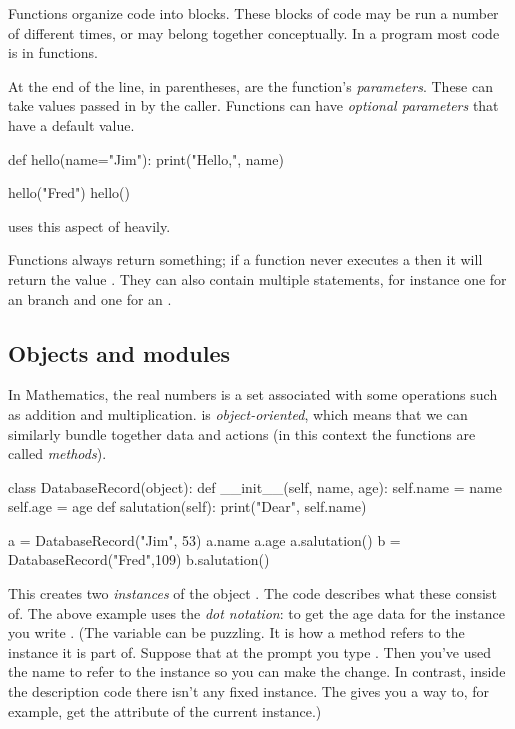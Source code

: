 Functions organize code into blocks. 
These blocks of code may be 
run a number of different times, or may belong together conceptually. 
In a \python{} program most code is in functions. 

At the end of the  line, in parentheses, are
the function's \textit{parameters}. 
These can take values 
passed in by the caller.
Functions can have \textit{optional parameters} that have a default value.
\begin{pythonconsole}
def hello(name="Jim"):
    print("Hello,", name)

hello("Fred")
hello()
\end{pythonconsole}
\noindent
\Sage{} uses this aspect of \python{} heavily.

Functions always return something; 
if a function never executes a  then it will
return the value .
They can also contain multiple  statements, for instance 
one for an  branch and one for an .




\subsection{Objects and modules}
In Mathematics, the real numbers is a set associated with some operations
such as addition and multiplication.
\python{} is \textit{object-oriented}, which means that we can similarly bundle
together data and actions (in this context the functions are called 
\textit{methods}).
\begin{pythonconsole}
class DatabaseRecord(object):
    def __init__(self, name, age):
        self.name = name
        self.age = age
    def salutation(self):
        print("Dear", self.name)

a = DatabaseRecord("Jim", 53)
a.name
a.age
a.salutation()
b = DatabaseRecord("Fred",109)
b.salutation()
\end{pythonconsole}
\noindent
This creates two \textit{instances} of the object 
.
The  code describes what these consist of.
The above example uses the \textit{dot notation}:
to get the age data for the instance 
you write 
.
(The \protect{} variable 
can  be puzzling.
It is how a method refers to the instance it is part of.
Suppose that at the prompt you type .
Then you've used the name  
to refer to the instance so you can
make the change.
In contrast,
inside the  description code there isn't any fixed instance. 
The  gives you a way to, for example, 
get the  attribute
of the current instance.)

